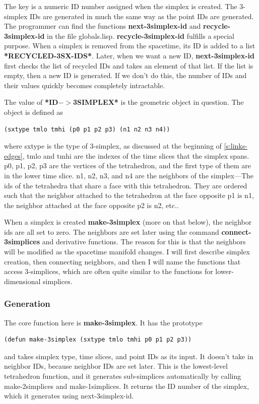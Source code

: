\message{ !name(programmers_guide.tex)}\documentclass[12pt]{article}
\begin{document}
The key is a numeric ID number assigned when the simplex is
created. The 3-simplex IDs are generated in much the same way as the
point IDs are generated. The programmer can find the functions
\textbf{next-3simplex-id} and \textbf{recycle-3simplex-id} in the file
globals.lisp. \textbf{recycle-3simplex-id} fulfills a special
purpose. When a simplex is removed from the spacetime, its ID is added
to a list \textbf{*RECYCLED-3SX-IDS*}. Later, when we want a new ID,
\textbf{next-3simplex-id} first checks the list of recycled IDs and
takes an element of that list. If the list is empty, then a new ID is
generated. If we don't do this, the number of IDs and their values
quickly becomes completely intractable.

The value of \textbf{*ID$->$3SIMPLEX*} is the geometric object in
question. The object is defined as
\begin{lstlisting}
(sxtype tmlo tmhi (p0 p1 p2 p3) (n1 n2 n3 n4))
\end{lstlisting}
where sxtype is the type of 3-simplex, as discussed at the beginning
of \ref{s:links-edges}, tmlo and tmhi are the indexes of the
time slices that the simplex spans. p0, p1, p2, p3 are the vertices of
the tetrahedron, and the first type of them are in the lower time
slice. n1, n2, n3, and n4 are the neighbors of the simplex---The ids
of the tetrahedra that share a face with this tetrahedron. They are
ordered such that the neighbor attached to the tetrahedron at the face
opposite p1 is n1, the neighbor attached at the face opposite p2 is
n2, etc..

When a simplex is created \textbf{make-3simplex} (more on that below),
the neighbor ids are all set to zero. The neighbors are set later
using the command \textbf{connect-3simplices} and derivative
functions. The reason for this is that the neighbors will be modified
as the spacetime manifold changes. I will first describe simplex
creation, then connecting neighbors, and then I will name the
functions that access 3-simplices, which are often quite similar to
the functions for lower-dimensional simplices.

\subsubsection{Generation}
The core function here is \textbf{make-3simplex}. It has the prototype 
\begin{lstlisting}
(defun make-3simplex (sxtype tmlo tmhi p0 p1 p2 p3))
\end{lstlisting}
and takes simplex type, time slices, and point IDs as its input. It
doesn't take in neighbor IDs, because neighbor IDs are set later. This
is the lowest-level tetrahedron function, and it generates
sub-simplices automatically by calling make-2simplices and
make-1simplices. It returns the ID number of the simplex, which it
generates using next-3simplex-id. 
\end{document}
